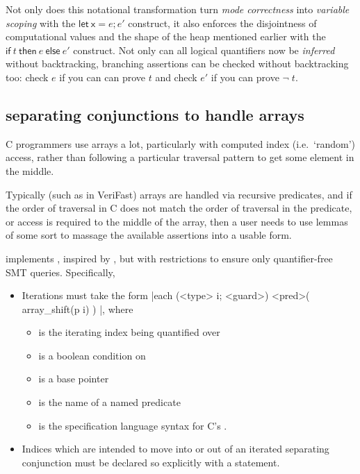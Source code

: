 Not only does this notational transformation turn \emph{mode correctness} into
\emph{variable scoping} with the $\mathsf{let\ x} = e; e'$ construct, it also
enforces the disjointness of computational values and the shape of the heap
mentioned earlier with the $\mathsf{if}\ t\ \mathsf{then}\ e\ \mathsf{else}\
e'$ construct. Not only can all logical quantifiers now be \emph{inferred}
without backtracking, branching assertions can be checked without backtracking
too: check $e$ if you can can prove $t$ and check $e'$ if you can prove
$\neg\;t$.

\subsection{ separating conjunctions to handle arrays}\label{sec:it-array}

C programmers use arrays a lot, particularly with computed index (i.e.\
`random') access, rather than following a particular traversal pattern to get
some element in the middle.

Typically (such as in VeriFast) arrays are handled via recursive predicates,
and if the order of traversal in C does not match the order of traversal in the
predicate, or access is required to the middle of the array, then a user needs
to use lemmas of some sort to massage the available assertions into a usable
form.

 implements , inspired by
, but with restrictions to ensure only
quantifier-free SMT queries. Specifically,
\begin{itemize}
    \item Iterations must take the form
        \cninline[breaklines]|each (<type> i; <guard>) { <pred>( array_shift(p i) ) }|, %
        where
        \begin{itemize}
            \item {} is the iterating index being quantified over
            \item {} is a boolean condition on 
            \item \cninline{p} is a base pointer
            \item \cninline{<pred>} is the name of a named predicate
            \item \cninline{array_shift} is the specification language syntax
                for C's \cinline{p + i}.
        \end{itemize}
    \item Indices which are intended to move into or out of an iterated separating
        conjunction must be declared so explicitly with a 
        statement.
\end{itemize}

